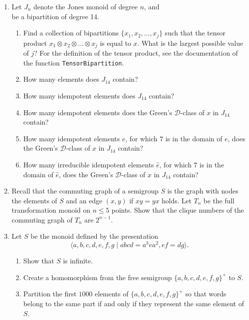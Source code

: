 \documentclass{article}
\begin{document}
\begin{enumerate}
  \item Let $J_n$ denote the Jones monoid of degree $n$, and
    \[
      
    \]
    be a bipartition of degree 14.
    \begin{enumerate}
      \item Find a collection of bipartitions $\{x_1, x_2, \dots,
        x_j\}$ such that the tensor product $x_1 \otimes x_2 \otimes
        \dots \otimes x_j$ is equal to $x$. What is the largest
        possible value of $j$? For the definition of the tensor product, see the
        documentation of the function \texttt{TensorBipartition}.
      \item How many elements does $J_{14}$ contain?
      \item How many idempotent elements does $J_{14}$ contain?
      \item How many idempotent elements does the Green's
        $\mathscr{D}$-class of $x$ in $J_{14}$ contain?
      \item How many idempotent elements $e$, for which $7$ is in the
        domain of $e$, does the Green's $\mathscr{D}$-class of $x$ in
        $J_{14}$ contain?
      \item How many irreducible idempotent elements $\hat{e}$, for
        which $7$ is in the domain of $\hat{e}$, does the Green's
        $\mathscr{D}$-class of $x$ in $J_{14}$ contain?
    \end{enumerate}

  \item
    Recall that the commuting graph of a semigroup  $S$ is the graph with nodes
    the elements of $S$ and an edge $(x, y)$ if $xy = yx$ holds.
    Let $T_n$ be the full transformation monoid on $n \leq 5$ points. Show that
    the clique numbers of the commuting graph of $T_n$ are $2 ^ {n - 1}$.

  \item
    Let $S$ be the monoid defined by the presentation
    \[
      \langle a, b, c, d, e, f, g \mid abcd = a^3ea^2, ef= dg\rangle.
    \]
    \begin{enumerate}
      \item
        Show that $S$ is infinite.
      \item
        Create a homomorphism from the free semigroup $\{a, b, c, d,
        e, f, g\}^+$ to $S$.
      \item
        Partition the first $1000$ elements of $\{a, b, c, d, e, f, g\}^+$ so
        that words belong to the same part if and only if they represent the
        same element of $S$.
    \end{enumerate}


\end{enumerate}
\end{document}
